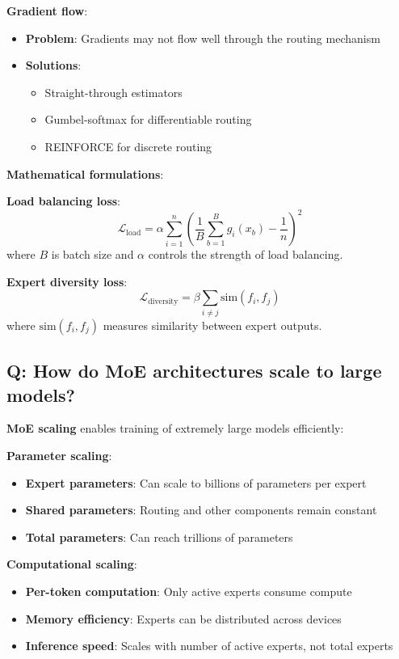 \textbf{Gradient flow}:
\begin{itemize}
	\item \textbf{Problem}: Gradients may not flow well through the routing mechanism
	\item \textbf{Solutions}:
	\begin{itemize}
		\item Straight-through estimators
		\item Gumbel-softmax for differentiable routing
		\item REINFORCE for discrete routing
	\end{itemize}
\end{itemize}

\textbf{Mathematical formulations}:

\textbf{Load balancing loss}:
\[
\mathcal{L}_{\text{load}} = \alpha \sum_{i=1}^{n} \left(\frac{1}{B} \sum_{b=1}^{B} g_i(x_b) - \frac{1}{n}\right)^2
\]
where \(B\) is batch size and \(\alpha\) controls the strength of load balancing.

\textbf{Expert diversity loss}:
\[
\mathcal{L}_{\text{diversity}} = \beta \sum_{i \neq j} \text{sim}(f_i, f_j)
\]
where \(\text{sim}(f_i, f_j)\) measures similarity between expert outputs.

\subsection*{Q: How do MoE architectures scale to large models?}
\textbf{MoE scaling} enables training of extremely large models efficiently:

\textbf{Parameter scaling}:
\begin{itemize}
	\item \textbf{Expert parameters}: Can scale to billions of parameters per expert
	\item \textbf{Shared parameters}: Routing and other components remain constant
	\item \textbf{Total parameters}: Can reach trillions of parameters
\end{itemize}

\textbf{Computational scaling}:
\begin{itemize}
	\item \textbf{Per-token computation}: Only active experts consume compute
	\item \textbf{Memory efficiency}: Experts can be distributed across devices
	\item \textbf{Inference speed}: Scales with number of active experts, not total experts
\end{itemize}

